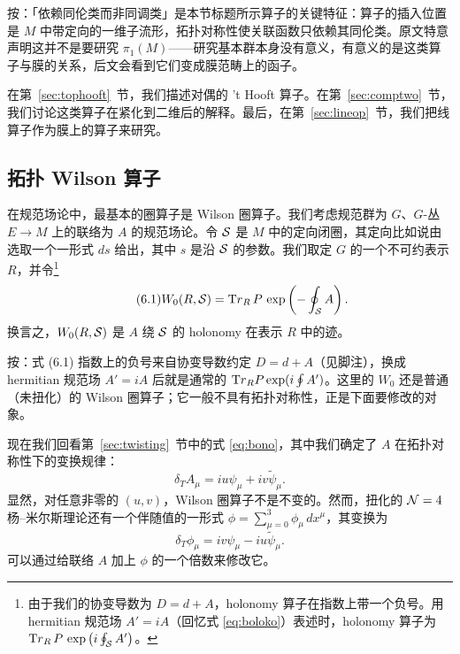 \begin{yizhu}[含糊点拨]
按：「依赖同伦类而非同调类」是本节标题所示算子的关键特征：算子的插入位置是 $M$ 中带定向的一维子流形，拓扑对称性使关联函数只依赖其同伦类。原文特意声明这并不是要研究 $\pi_1(M)$——研究基本群本身没有意义，有意义的是这类算子与膜的关系，后文会看到它们变成膜范畴上的函子。
\end{yizhu}

在第~\ref{sec:tophooft}~节，我们描述对偶的 't Hooft 算子。在第~\ref{sec:comptwo}~节，我们讨论这类算子在紧化到二维后的解释。最后，在第~\ref{sec:lineop}~节，我们把线算子作为膜上的算子来研究。

\subsection{拓扑 Wilson 算子}

\label{sec:topwil}

在规范场论中，最基本的圈算子是 Wilson 圈算子。我们考虑规范群为 $G$、$G$-丛 $E\to M$ 上的联络为 $A$ 的规范场论。令 ${\cal S}$ 是 $M$ 中的定向闭圈，其定向比如说由选取一个一形式 $ds$ 给出，其中 $s$ 是沿 ${\cal S}$ 的参数。我们取定 $G$ 的一个不可约表示 $R$，并令\footnote{由于我们的协变导数为 $D=d+A$，holonomy 算子在指数上带一个负号。用 hermitian 规范场 $A'=iA$（回忆式 \eqref{eq:boloko}）表述时，holonomy 算子为 ${\rm Tr}_R\,P\,\exp\left(i\oint_{\cal S} A'\right)$。}
\begin{equation*}
\tag*{(6.1)}
W_0(R,{{\cal S}})={\rm Tr}_R
\,P\,\exp\left(-\oint_{{\cal S}} A\right).
\end{equation*}
换言之，$W_0(R,{\cal S})$ 是 $A$ 绕 ${\cal S}$ 的 holonomy 在表示 $R$ 中的迹。

\begin{yizhu}[易错点]
按：式 (6.1) 指数上的负号来自协变导数约定 $D=d+A$（见脚注），换成 hermitian 规范场 $A'=iA$ 后就是通常的 ${\rm Tr}_R P\exp(i\oint A')$。这里的 $W_0$ 还是普通（未扭化）的 Wilson 圈算子；它一般不具有拓扑对称性，正是下面要修改的对象。
\end{yizhu}

现在我们回看第~\ref{sec:twisting}~节中的式 \eqref{eq:bono}，其中我们确定了 $A$ 在拓扑对称性下的变换规律：%
\setcounter{equation}{1}
\begin{equation}\label{eq:likp}
\delta_T
A_\mu=iu\psi_\mu+iv\tilde\psi_\mu.
\end{equation}
显然，对任意非零的 $(u,v)$，Wilson 圈算子不是不变的。然而，扭化的 ${\EUN}=4$ 杨--米尔斯理论还有一个伴随值的一形式 $\phi=\sum_{\mu=0}^3\phi_\mu\,dx^\mu$，其变换为
\setcounter{equation}{2}
\begin{equation}\label{eq:nikp}
\delta_T\phi_\mu=iv\psi_\mu-iu\tilde\psi_\mu.
\end{equation}
可以通过给联络 $A$ 加上 $\phi$ 的一个倍数来修改它。

